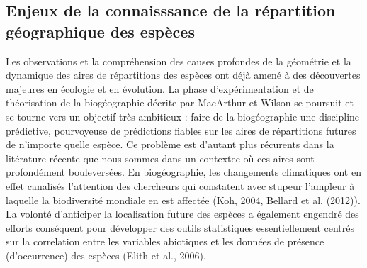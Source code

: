 \subsection*{Enjeux de la connaisssance de la répartition géographique
des
espèces}\label{enjeux-de-la-connaisssance-de-la-ruxe9partition-guxe9ographique-des-espuxe8ces}

Les observations et la compréhension des causes profondes de la
géométrie et la dynamique des aires de répartitions des espèces ont déjà
amené à des découvertes majeures en écologie et en évolution. La phase
d'expérimentation et de théorisation de la biogéographie décrite par
MacArthur et Wilson se poursuit et se tourne vers un objectif très
ambitieux : faire de la biogéographie une discipline prédictive,
pourvoyeuse de prédictions fiables sur les aires de répartitions futures
de n'importe quelle espèce. Ce problème est d'autant plus récurents dans
la litérature récente que nous sommes dans un contextee où ces aires
sont profondément bouleversées. En biogéographie, les changements
climatiques ont en effet canalisés l'attention des chercheurs qui
constatent avec stupeur l'ampleur à laquelle la biodiversité mondiale en
est affectée (Koh, 2004, Bellard et al. (2012)). La volonté d'anticiper
la localisation future des espèces a également engendré des efforts
conséquent pour développer des outils statistiques essentiellement
centrés sur la correlation entre les variables abiotiques et les données
de présence (d'occurrence) des espèces (Elith et al., 2006).

